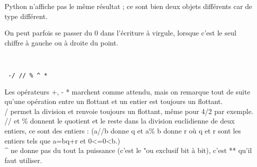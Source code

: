 \begin{multicols}{2}

\ifprof
\begin{corrige}
Python n'affiche pas le même résultat ; ce sont bien deux objets différents car de type différent.
 \end{corrige}
 \else
 \fi
 
 
\ifprof
\begin{corrige}{On peut parfois se passer du 0 dans l'écriture à virgule, lorsque c'est le seul chiffre à gauche ou à droite du point.}
\end{corrige}
\else\fi

%

\exer{}\\
 \begin{center}
 \texttt{ -\quad  * \quad  / \quad // \quad \% \quad \^{} \quad **}
\end{center}

\ifprof
\begin{corrige}
{Les opérateurs +, - * marchent comme attendu, mais on remarque tout de suite qu'une opération entre un flottant et un entier est toujours un flottant.\\}
{/ permet la division et renvoie toujours un flottant, même pour 4/2 par exemple.\\ // et \% donnent le quotient et le reste dans la division euclidienne de deux entiers, ce sont des entiers : (a//b donne q et a\% b donne r où q et r sont les entiers tels que a=bq+r et 0<=0<b.)\\}
{\^{} ne donne pas du tout la puissance (c'est le "ou exclusif bit à bit), c'est ** qu'il faut utiliser.}

\end{corrige}
\else
\fi


\end{multicols}
